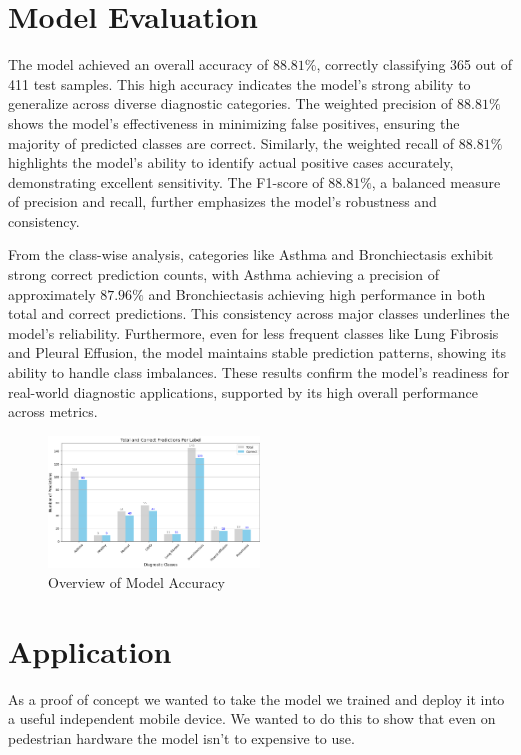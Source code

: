 \documentclass[twocolumn]{article}
\begin{document}
\section{Model Evaluation}
The model achieved an overall accuracy of \(88.81\%\), correctly classifying 365 out of 411 test samples. This high accuracy indicates the model's strong ability to generalize across diverse diagnostic categories. The weighted precision of \(88.81\%\) shows the model's effectiveness in minimizing false positives, ensuring the majority of predicted classes are correct. Similarly, the weighted recall of \(88.81\%\) highlights the model's ability to identify actual positive cases accurately, demonstrating excellent sensitivity. The F1-score of \(88.81\%\), a balanced measure of precision and recall, further emphasizes the model's robustness and consistency.

From the class-wise analysis, categories like Asthma and Bronchiectasis exhibit strong correct prediction counts, with Asthma achieving a precision of approximately \(87.96\%\) and Bronchiectasis achieving high performance in both total and correct predictions. This consistency across major classes underlines the model's reliability. Furthermore, even for less frequent classes like Lung Fibrosis and Pleural Effusion, the model maintains stable prediction patterns, showing its ability to handle class imbalances. These results confirm the model's readiness for real-world diagnostic applications, supported by its high overall performance across metrics.

\begin{figure}[h]
  \centering
  \includegraphics[width=0.5\textwidth]{Diagnostic}
  \caption{Overview of Model Accuracy}
  \label{fig:Diagnostic}
\end{figure}

\section{Application}
As a proof of concept we wanted to take the model we trained and deploy it into a useful independent mobile device. We wanted to do this to show that even on pedestrian hardware the model isn't to expensive to use.
\end{document}

